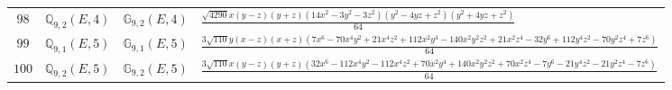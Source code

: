 \documentclass[fleqn,8pt,landscape]{jsarticle}
\begin{document}
\begin{table}[ht!]
\begin{center}
\begin{tabular}{cccl}
$ 98 $ & $ \mathbb{Q}_{9,2}(E,4) $ & $ \mathbb{G}_{9,2}(E,4) $ & $ \frac{\sqrt{4290} x \left(y - z\right) \left(y + z\right) \left(14 x^{2} - 3 y^{2} - 3 z^{2}\right) \left(y^{2} - 4 y z + z^{2}\right) \left(y^{2} + 4 y z + z^{2}\right)}{64} $ \\
$ 99 $ & $ \mathbb{Q}_{9,1}(E,5) $ & $ \mathbb{G}_{9,1}(E,5) $ & $ \frac{3 \sqrt{110} y \left(x - z\right) \left(x + z\right) \left(7 x^{6} - 70 x^{4} y^{2} + 21 x^{4} z^{2} + 112 x^{2} y^{4} - 140 x^{2} y^{2} z^{2} + 21 x^{2} z^{4} - 32 y^{6} + 112 y^{4} z^{2} - 70 y^{2} z^{4} + 7 z^{6}\right)}{64} $ \\
$ 100 $ & $ \mathbb{Q}_{9,2}(E,5) $ & $ \mathbb{G}_{9,2}(E,5) $ & $ \frac{3 \sqrt{110} x \left(y - z\right) \left(y + z\right) \left(32 x^{6} - 112 x^{4} y^{2} - 112 x^{4} z^{2} + 70 x^{2} y^{4} + 140 x^{2} y^{2} z^{2} + 70 x^{2} z^{4} - 7 y^{6} - 21 y^{4} z^{2} - 21 y^{2} z^{4} - 7 z^{6}\right)}{64} $ \\
 \hline \hline
\end{tabular}
\end{center}
\end{table}
\end{document}
